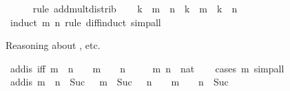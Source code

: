\begin{isabellebody}
\ \ \ \ \isamarkupfalse%
\ {\isacharparenleft}{\kern0pt}rule\ add{\isacharunderscore}{\kern0pt}mult{\isacharunderscore}{\kern0pt}distrib{\isacharparenright}{\kern0pt}\isanewline
\ \ \isamarkupfalse%
\ {\isachardoublequoteopen}k\ {\isacharasterisk}{\kern0pt}\ {\isacharparenleft}{\kern0pt}m\ {\isacharminus}{\kern0pt}\ n{\isacharparenright}{\kern0pt}\ {\isacharequal}{\kern0pt}\ {\isacharparenleft}{\kern0pt}k\ {\isacharasterisk}{\kern0pt}\ m{\isacharparenright}{\kern0pt}\ {\isacharminus}{\kern0pt}\ {\isacharparenleft}{\kern0pt}k\ {\isacharasterisk}{\kern0pt}\ n{\isacharparenright}{\kern0pt}{\isachardoublequoteclose}\isanewline
\ \ \ \ \isamarkupfalse%
\ {\isacharparenleft}{\kern0pt}induct\ m\ n\ rule{\isacharcolon}{\kern0pt}\ diff{\isacharunderscore}{\kern0pt}induct{\isacharparenright}{\kern0pt}\ simp{\isacharunderscore}{\kern0pt}all\isanewline
{}\isamarkupfalse%
%
\endisatagproof
{\isafoldproof}%
%
\isadelimproof
\isanewline
%
\endisadelimproof
\isanewline
{}\isamarkupfalse%
%
\isadelimdocument
%
\endisadelimdocument
%
\isatagdocument
%
\isamarkuptrue%
%
\endisatagdocument
{\isafolddocument}%
%
\isadelimdocument
%
\endisadelimdocument
%
\begin{isamarkuptext}%
Reasoning about , etc.%
\end{isamarkuptext}\isamarkuptrue%
\isamarkupfalse%
\ add{\isacharunderscore}{\kern0pt}is{\isacharunderscore}{\kern0pt}{}\ {\isacharbrackleft}{\kern0pt}iff{\isacharbrackright}{\kern0pt}{\isacharcolon}{\kern0pt}\ {\isachardoublequoteopen}m\ {\isacharplus}{\kern0pt}\ n\ {\isacharequal}{\kern0pt}\ {}\ {\isasymlongleftrightarrow}\ m\ {\isacharequal}{\kern0pt}\ {}\ {\isasymand}\ n\ {\isacharequal}{\kern0pt}\ {}{\isachardoublequoteclose}\isanewline
\ \ \ m\ n\ {\isacharcolon}{\kern0pt}{\isacharcolon}{\kern0pt}\ nat\isanewline
%
\isadelimproof
\ \ %
\endisadelimproof
%
\isatagproof
{}\isamarkupfalse%
\ {\isacharparenleft}{\kern0pt}cases\ m{\isacharparenright}{\kern0pt}\ simp{\isacharunderscore}{\kern0pt}all%
\endisatagproof
{\isafoldproof}%
%
\isadelimproof
\isanewline
%
\endisadelimproof
\isanewline
{}\isamarkupfalse%
\ add{\isacharunderscore}{\kern0pt}is{\isacharunderscore}{\kern0pt}{}{\isacharcolon}{\kern0pt}\ {\isachardoublequoteopen}m\ {\isacharplus}{\kern0pt}\ n\ {\isacharequal}{\kern0pt}\ Suc\ {}\ {\isasymlongleftrightarrow}\ m\ {\isacharequal}{\kern0pt}\ Suc\ {}\ {\isasymand}\ n\ {\isacharequal}{\kern0pt}\ {}\ {\isasymor}\ m\ {\isacharequal}{\kern0pt}\ {}\ {\isasymand}\ n\ {\isacharequal}{\kern0pt}\ Suc\ {}{\isachardoublequoteclose}\isanewline

\end{isabellebody}
